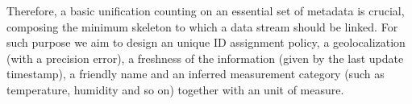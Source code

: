 Therefore, a basic unification counting on an essential set of metadata is crucial, composing the minimum skeleton to which a data stream should be linked.
For such purpose we aim to design an unique ID assignment policy, a geolocalization (with a precision error), a freshness of the information (given by the last update timestamp), a friendly name and an inferred measurement category (such as temperature, humidity and so on) together with an unit of measure.

